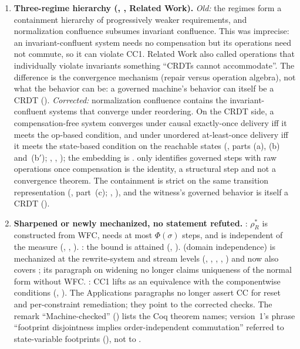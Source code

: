 \documentclass[11pt,a4paper]{article}
\theoremstyle{plain}
\theoremstyle{definition}
\theoremstyle{remark}
\begin{document}
\begin{enumerate}[leftmargin=*,label=\textbf{E\arabic*.},ref=E\arabic*]
\item \textbf{Three-regime hierarchy (,
  , Related Work).}
  \emph{Old:} the regimes form a containment hierarchy of progressively
  weaker requirements, and normalization confluence subsumes invariant
  confluence.  This was imprecise: an invariant-confluent system needs no
  compensation but its operations need not commute, so it can violate CC1.
  Related Work also called operations that individually violate invariants
  something ``CRDTs cannot accommodate''.  The difference is the convergence
  mechanism (repair versus operation algebra), not what the behavior can be:
  a governed machine's behavior can itself be a CRDT
  ().
  \emph{Corrected:} normalization confluence contains the
  invariant-confluent systems that converge under reordering.  On the CRDT
  side, a compensation-free system converges under causal exactly-once
  delivery iff it meets the op-based condition, and under unordered
  at-least-once delivery iff it meets the state-based condition on the
  reachable states (, parts (a), (b) and~(b$'$);
  , ,
  ); the embedding is .
   only identifies governed steps with raw
  operations once compensation is the identity, a structural step and not a
  convergence theorem.  The containment is strict on the same transition
  representation (, part~(c); ,
  ), and the witness's governed behavior is itself a
  CRDT ().

\item \textbf{Sharpened or newly mechanized, no statement refuted.}
  : $\rho_R^*$ is constructed from WFC, needs at most
  $\Phi(\sigma)$ steps, and is independent of the measure
  (, ,
  ).  : the bound is attained
  (, ).
   (domain independence) is mechanized at the
  rewrite-system and stream levels (,
  , ,
  , ) and now also covers
  ; its paragraph on widening no longer claims
  uniqueness of the normal form without WFC.  : CC1 lifts
  as an equivalence with the componentwise conditions
  (, ).  The
  Applications paragraphs no longer assert CC for reset and per-constraint
  remediation; they point to the corrected checks.  The remark
  ``Machine-checked'' () lists the Coq theorem
  names; version~1's phrase ``footprint disjointness implies
  order-independent commutation'' referred to state-variable footprints
  (), not to .
\end{enumerate}
\end{document}
